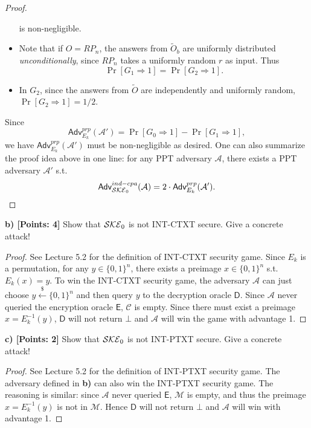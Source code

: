 \documentclass[12pt]{article}
\newcommand{\bits}{\{0,1\}}
\newcommand{\getsr}{\stackrel{\$}{\gets}}
\newcommand{\Adv}{\textsf{Adv}}
\newcommand{\M}{\mathcal{M}}
\newcommand{\C}{\mathcal{C}}
\theoremstyle{definition}
\newcommand{\A}{\mathcal{A}}
\begin{document}
\begin{proof}
\begin{itemize}
is non-negligible.
\item Note that if $O = RP_n$, the answers from $\widetilde{O}_b$ are uniformly distributed \emph{unconditionally}, since $RP_n$ takes a uniformly random $r$ as input. Thus
$$\Pr[G_1 \Rightarrow 1] = \Pr[G_2 \Rightarrow 1].$$
\item In $G_2$, since the answers from $\widetilde{O}$ are independently and uniformly random, $\Pr[G_2 \Rightarrow 1] = 1/2$.
\end{itemize}
Since
$$\Adv_{E_k}^{prp}(\A') = \Pr[G_0 \Rightarrow 1] - \Pr[G_1 \Rightarrow 1],$$
we have $\Adv_{E_k}^{prp}(\A')$ must be non-negligible as desired. One can also summarize the proof idea above in one line: for any PPT adversary $\A$, there exists a PPT adversary $\A'$ s.t.
$$\Adv_{\SKE_0}^{ind-cpa}(\A) = 2\cdot\Adv_{E_k}^{prp}(\A').$$
\end{proof}

\newcommand{\E}{\mathsf{E}}
\newcommand{\D}{\mathsf{D}}
{\bf b) [Points: 4]} Show that $\mathcal{SKE}_0$ is not INT-CTXT secure. Give a concrete attack!
\begin{proof}
See Lecture 5.2 for the definition of INT-CTXT security game.
Since $E_k$ is a permutation, for any $y \in \bits^n$, there exists a preimage $x \in \bits^n$ s.t. $E_k(x) = y$.
To win the INT-CTXT security game, the adversary $\A$ can just choose $y \getsr \bits^n$ and then query $y$ to the decryption oracle $\D$. Since $\A$ never queried the encryption oracle $\E$, $\C$ is empty. Since there must exist a preimage $x = E_k^{-1}(y)$, $\D$ will not return $\bot$ and $\A$ will win the game with advantage 1. 
\end{proof}

{\bf c) [Points: 2]} Show that $\mathcal{SKE}_0$ is not INT-PTXT secure. Give a concrete attack!
\begin{proof}
See Lecture 5.2 for the definition of INT-PTXT security game.
The adversary defined in {\bf b)} can also win the INT-PTXT security game. The reasoning is similar: since $\A$ never queried $\E$, $\M$ is empty, and thus the preimage $x = E_k^{-1}(y)$ is not in $\M$. Hence $\D$ will not return $\bot$ and $\A$ will win with advantage 1.
\end{proof}
\end{document}
